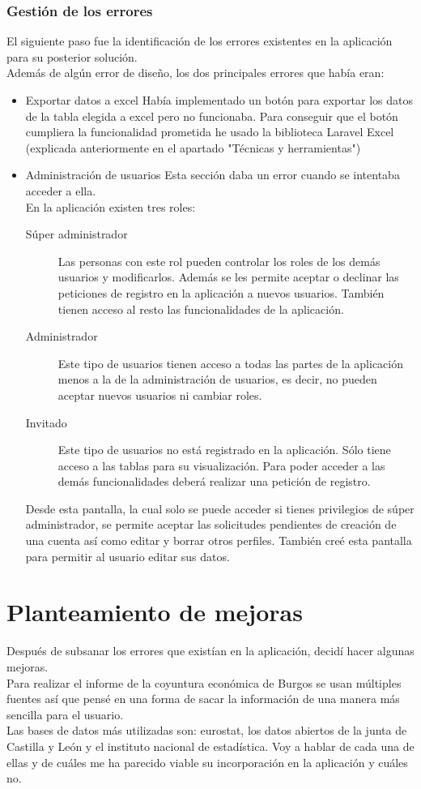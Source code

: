 \subsubsection{Gestión de los errores}
El siguiente paso fue la identificación de los errores existentes en la aplicación para su posterior solución.\\
Además de algún error de diseño, los dos principales errores que había eran:
\begin{itemize}
    \item {Exportar datos a excel} Había implementado un botón para exportar los datos de la tabla elegida a excel pero no funcionaba. Para conseguir que el botón cumpliera la funcionalidad prometida he usado la biblioteca Laravel Excel (explicada anteriormente en el apartado "Técnicas y herramientas")
    \item{Administración de usuarios} Esta sección daba un error cuando se intentaba acceder a ella.\\
    En la aplicación existen tres roles:
    \begin{description}
        \item [Súper administrador] Las personas con este rol pueden controlar los roles de los demás usuarios y modificarlos.
        Además se les permite aceptar o declinar las peticiones de registro en la aplicación a nuevos usuarios. También tienen acceso al resto las funcionalidades de la aplicación.
        \item [Administrador] Este tipo de usuarios tienen acceso a todas las partes de la aplicación menos a la de la administración de usuarios, es decir, no pueden aceptar nuevos usuarios ni cambiar roles.
        \item [Invitado] Este tipo de usuarios no está registrado en la aplicación. Sólo tiene acceso a las tablas para su visualización. Para poder acceder a las demás funcionalidades deberá realizar una petición de registro.
    \end{description}
    Desde esta pantalla, la cual solo se puede acceder si tienes privilegios de súper administrador, se permite aceptar las solicitudes pendientes de creación de una cuenta así como editar y borrar otros perfiles.
    También creé esta pantalla para permitir al usuario editar sus datos.
\end{itemize}
\section{Planteamiento de mejoras}
Después de subsanar los errores que existían en la aplicación, decidí hacer algunas mejoras.\\
Para realizar el informe de la coyuntura económica de Burgos se usan múltiples fuentes así que pensé en una forma de sacar la información de una manera más sencilla para el usuario.\\
Las bases de datos más utilizadas son: eurostat, los datos abiertos de la junta de Castilla y León y el instituto nacional de estadística. Voy a hablar de cada una de ellas y de cuáles me ha parecido viable su incorporación en la aplicación y cuáles no.
